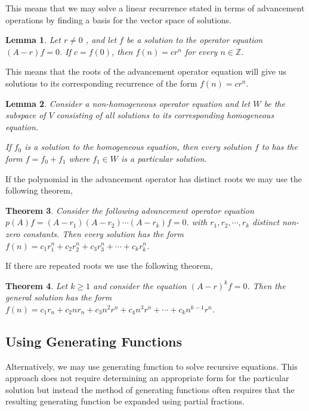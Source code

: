 \documentclass{article}
\newtheorem{theorem}{Theorem}[section]
\newtheorem{lemma}[theorem]{Lemma}
\begin{document}
This means that we may solve a linear recurrence stated in terms of advancement operations by finding a basis for the vector space of solutions.

\begin{lemma}
    Let $r \neq 0$ , and let $f$ be a solution to the operator equation $(A - r)f=0$. If $c=f(0)$, then $f(n)=c r^n$ for every $n \in \mathbb Z$.
\end{lemma}

This means that the roots of the advancement operator equation will give us solutions to its corresponding recurrence of the form $f(n) = c r^n$.


\begin{lemma}
Consider a non-homogeneous operator equation and let $W$ be the subspace of $V$ consisting of all solutions to its corresponding homogeneous equation.

If $f_0$ is a solution to the homogeneous equation, then every solution $f$ to has the form $f = f_0 + f_1$ where $f_1 \in W$ is a particular solution.
\end{lemma}

If the  polynomial in the advancement operator has distinct roots we may use the following theorem,

\begin{theorem}
Consider the following advancement operator equation $p(A) f = (A-r_1)(A-r_2)\cdots(A-r_k)f=0$. with $r_1 , r_2 , \cdots , r_k$ distinct non-zero constants. Then every solution has the form $f(n) = c_1 r_1^n + c_2 r_2^n + c_3 r_3^n + \cdots + c_k r_k^n$.
\end{theorem}

If there are repeated roots we use the following theorem,
\begin{theorem}
Let $k \geq 1$ and consider the equation $( A - r )^k f = 0$. Then the general solution has the form $f(n) = c_1 r_n + c_2 n r_n + c_3 n^2r^n + c_4 n^3 r^n + \cdots + c_k n^{k - 1} r ^n$.
\end{theorem}

\subsection{Using Generating Functions}
Alternatively, we may use generating function to solve recursive equations. This approach does not require determining an appropriate form for the particular solution but instead the method of generating functions often requires that the resulting generating function be expanded using partial fractions. 
\end{document}
